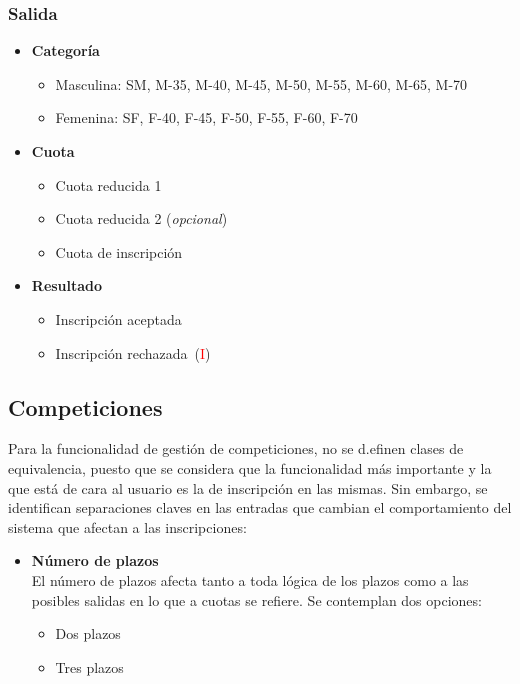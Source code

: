 \subsubsection{Salida}
\begin{itemize}
	\item \textbf{Categoría}
		\begin{itemize}
			\item Masculina: SM, M-35, M-40, M-45, M-50, M-55, M-60, M-65, M-70
			\item Femenina: SF, F-40, F-45, F-50, F-55, F-60, F-70
		\end{itemize}
	\item \textbf{Cuota}
		\begin{itemize}
			\item Cuota reducida 1
			\item Cuota reducida 2 (\textit{opcional})
			\item Cuota de inscripción
		\end{itemize}
	\item \textbf{Resultado}
		\begin{itemize}
			\item Inscripción aceptada
			\item Inscripción rechazada~(\textcolor{red}{I})
		\end{itemize}
\end{itemize}
\newpage{}
\subsection{Competiciones}
Para la funcionalidad de gestión de competiciones, no se d.efinen
clases de equivalencia, puesto que se considera que la funcionalidad más importante y la que
está de cara al usuario es la de inscripción en las mismas. Sin embargo, se identifican
separaciones claves en las entradas que cambian el comportamiento del sistema que afectan a
las inscripciones:

\begin{itemize}
	\item \textbf{Número de plazos}
		\\ El número de plazos afecta tanto a toda lógica de los plazos como a las posibles
		salidas en lo que a cuotas se refiere. Se contemplan dos opciones: \begin{itemize}
			\item Dos plazos
			\item Tres plazos
		\end{itemize}
\end{itemize}

